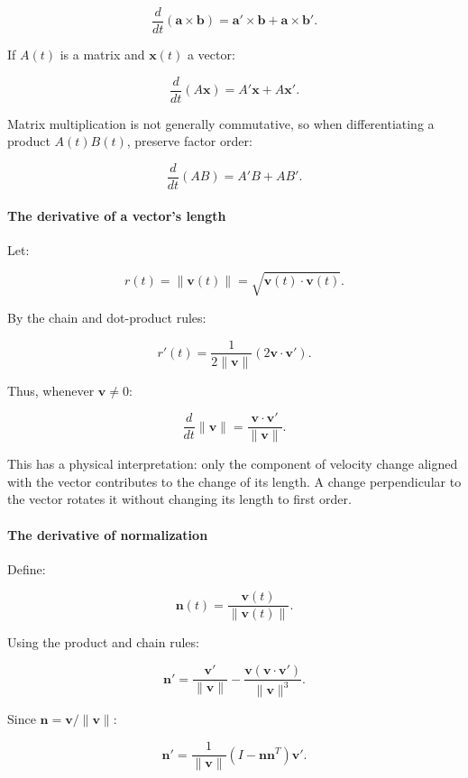 \[
\frac d{dt}(\mathbf a\times\mathbf b) =\mathbf a'\times\mathbf b+\mathbf a\times\mathbf b'.
\]

If \(A(t)\) is a matrix and \(\mathbf x(t)\) a vector:

\[
\frac d{dt}(A\mathbf x) =A'\mathbf x+A\mathbf x'.
\]

Matrix multiplication is not generally commutative, so when differentiating a product \(A(t)B(t)\), preserve factor order:

\[
\frac d{dt}(AB)=A'B+AB'.
\]

\paragraph{The derivative of a vector's length}\label{02-foundations-ii-ch021-the-derivative-of-a-vectors-length}

Let:

\[
r(t)=\|\mathbf v(t)\| =\sqrt{\mathbf v(t)\cdot\mathbf v(t)}.
\]

By the chain and dot-product rules:

\[
r'(t)=\frac1{2\|\mathbf v\|} \left(2\mathbf v\cdot\mathbf v'\right).
\]

Thus, whenever \(\mathbf v\ne0\):

\[
\boxed{\frac d{dt}\|\mathbf v\| =\frac{\mathbf v\cdot\mathbf v'}{\|\mathbf v\|}}.
\]

This has a physical interpretation: only the component of velocity change aligned with the vector contributes to the change of its length. A change perpendicular to the vector rotates it without changing its length to first order.

\paragraph{The derivative of normalization}\label{02-foundations-ii-ch021-the-derivative-of-normalization}

Define:

\[
\mathbf n(t)=\frac{\mathbf v(t)}{\|\mathbf v(t)\|}.
\]

Using the product and chain rules:

\[
\mathbf n' = \frac{\mathbf v'}{\|\mathbf v\|} - \frac{\mathbf v(\mathbf v\cdot\mathbf v')}{\|\mathbf v\|^3}.
\]

Since \(\mathbf n=\mathbf v/\|\mathbf v\|\):

\[
\boxed{ \mathbf n' = \frac1{\|\mathbf v\|} \left(I-\mathbf n\mathbf n^T\right)\mathbf v' }.
\]

